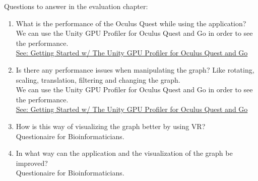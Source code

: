 Questions to answer in the evaluation chapter:

\begin{enumerate}
  \item{What is the performance of the Oculus Quest while using the application?}\\
  We can use the Unity GPU Profiler for Oculus Quest and Go in order to see the performance.\\
  \href{https://developer.oculus.com/blog/getting-started-w-the-unity-gpu-profiler-for-oculus-quest-and-go/}{See: Getting Started w/ The Unity GPU Profiler for Oculus Quest and Go}
  \item{Is there any performance issues when manipulating the graph? Like rotating, scaling, translation, filtering and changing the graph.}\\
  We can use the Unity GPU Profiler for Oculus Quest and Go in order to see the performance.\\
  \href{https://developer.oculus.com/blog/getting-started-w-the-unity-gpu-profiler-for-oculus-quest-and-go/}{See: Getting Started w/ The Unity GPU Profiler for Oculus Quest and Go}
  \item{How is this way of visualizing the graph better by using VR?}\\
  Questionaire for Bioinformaticians.
  \item{In what way can the application and the visualization of the graph be improved?}\\
  Questionaire for Bioinformaticians.
\end{enumerate}
